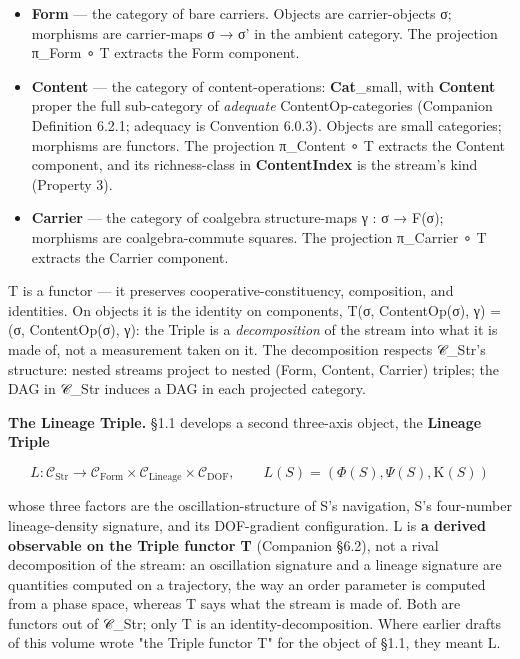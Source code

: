 \documentclass[11pt, openany]{book}
\begin{document}
\begin{itemize}
\item \textbf{Form} --- the category of bare carriers. Objects are carrier-objects σ; morphisms are carrier-maps σ → σ' in the ambient category. The projection π\_\allowbreak{}Form ∘ T extracts the Form component.
\item \textbf{Content} --- the category of content-operations: \textbf{Cat}\_\allowbreak{}small, with \textbf{Content} proper the full sub-category of \textit{adequate} ContentOp-categories (Companion Definition 6.2.1; adequacy is Convention 6.0.3). Objects are small categories; morphisms are functors. The projection π\_\allowbreak{}Content ∘ T extracts the Content component, and its richness-class in \textbf{ContentIndex} is the stream's kind (Property 3).
\item \textbf{Carrier} --- the category of coalgebra structure-maps γ : σ → F(σ); morphisms are coalgebra-commute squares. The projection π\_\allowbreak{}Carrier ∘ T extracts the Carrier component.
\end{itemize}

T is a functor --- it preserves cooperative-constituency, composition, and identities. On objects it is the identity on components, T(σ, ContentOp(σ), γ) = (σ, ContentOp(σ), γ): the Triple is a \textit{decomposition} of the stream into what it is made of, not a measurement taken on it. The decomposition respects 𝒞\_\allowbreak{}Str's structure: nested streams project to nested (Form, Content, Carrier) triples; the DAG in 𝒞\_\allowbreak{}Str induces a DAG in each projected category.

\textbf{The Lineage Triple.} §1.1 develops a second three-axis object, the \textbf{Lineage Triple}

$$L : \mathcal{C}_{\text{Str}} \to \mathcal{C}_{\text{Form}} \times \mathcal{C}_{\text{Lineage}} \times \mathcal{C}_{\text{DOF}}, \qquad L(S) = (\Phi(S), \Psi(S), \mathrm{K}(S))$$

whose three factors are the oscillation-structure of S's navigation, S's four-number lineage-density signature, and its DOF-gradient configuration. L is \textbf{a derived observable on the Triple functor T} (Companion §6.2), not a rival decomposition of the stream: an oscillation signature and a lineage signature are quantities computed on a trajectory, the way an order parameter is computed from a phase space, whereas T says what the stream is made of. Both are functors out of 𝒞\_\allowbreak{}Str; only T is an identity-decomposition. Where earlier drafts of this volume wrote "the Triple functor T" for the object of §1.1, they meant L.
\end{document}
